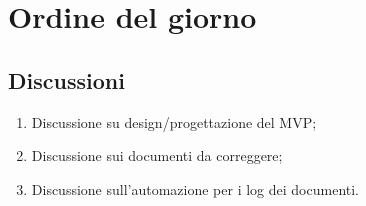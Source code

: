 \section{Ordine del giorno} \label{sec:agenda}
\subsection{Discussioni} \label{subsec:discussione}
\begin{enumerate}
    \item Discussione su design/progettazione del MVP;
    \item Discussione sui documenti da correggere;
    \item Discussione sull'automazione per i log dei documenti.
\end{enumerate}
